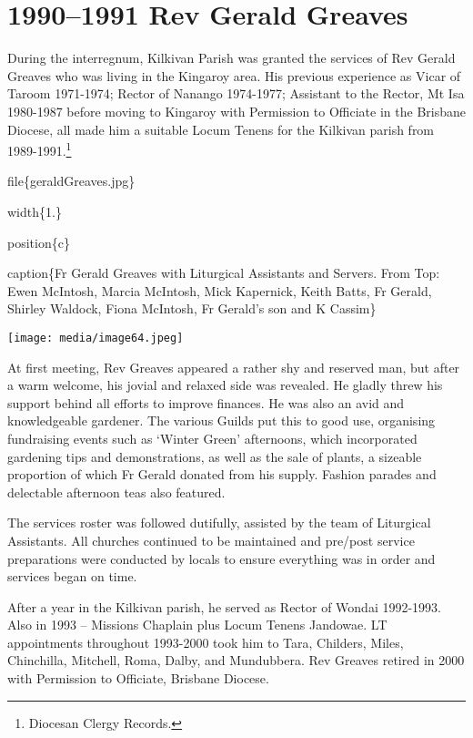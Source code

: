 \hypertarget{rev-gerald-greaves}{%
\section{1990--1991 Rev Gerald Greaves}\label{rev-gerald-greaves}}

During the interregnum, Kilkivan Parish was granted the services of Rev Gerald Greaves who was living in the Kingaroy area. His previous experience as Vicar of Taroom 1971-1974; Rector of Nanango 1974-1977; Assistant to the Rector, Mt Isa 1980-1987 before moving to Kingaroy with Permission to Officiate in the Brisbane Diocese, all made him a suitable Locum Tenens for the Kilkivan parish from 1989-1991.\footnote{Diocesan Clergy Records.}

file\{geraldGreaves.jpg\}

width\{1.\}

position\{c\}

caption\{Fr Gerald Greaves with Liturgical Assistants and Servers. From Top: Ewen McIntosh, Marcia McIntosh, Mick Kapernick, Keith Batts, Fr Gerald, Shirley Waldock, Fiona McIntosh, Fr Gerald's son and K Cassim\}

\texttt{[image: media/image64.jpeg]}

At first meeting, Rev Greaves appeared a rather shy and reserved man, but after a warm welcome, his jovial and relaxed side was revealed. He gladly threw his support behind all efforts to improve finances. He was also an avid and knowledgeable gardener. The various Guilds put this to good use, organising fundraising events such as `Winter Green' afternoons, which incorporated gardening tips and demonstrations, as well as the sale of plants, a sizeable proportion of which Fr Gerald donated from his supply. Fashion parades and delectable afternoon teas also featured.

The services roster was followed dutifully, assisted by the team of Liturgical Assistants. All churches continued to be maintained and pre/post service preparations were conducted by locals to ensure everything was in order and services began on time.

After a year in the Kilkivan parish, he served as Rector of Wondai 1992-1993. Also in 1993 -- Missions Chaplain plus Locum Tenens Jandowae. LT appointments throughout 1993-2000 took him to Tara, Childers, Miles, Chinchilla, Mitchell, Roma, Dalby, and Mundubbera. Rev Greaves retired in 2000 with Permission to Officiate, Brisbane Diocese.

